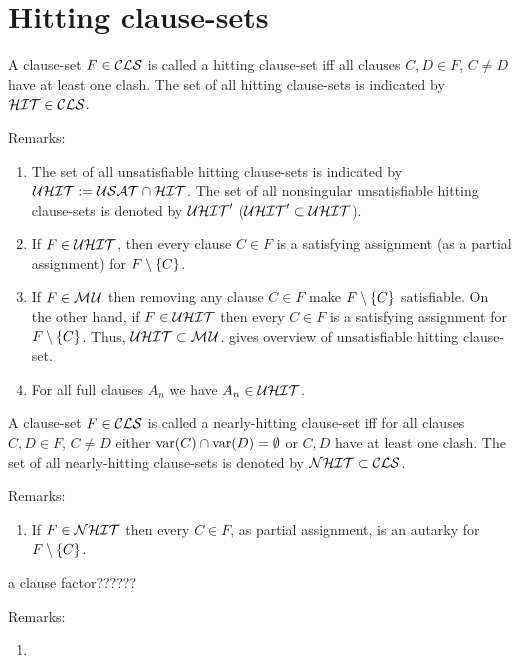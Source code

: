 \documentclass{report}
\begin{document}
\section{Hitting clause-sets}
\label{sec:hit}

\begin{defi}\label{def:hit-cls}
A clause-set $F \in \mathcal{CLS} $ is called a hitting clause-set iff all clauses $C,D \in F$, $C \not = D$ have at least one clash. The set of all hitting clause-sets is indicated by $\mathcal{HIT} \in \mathcal{CLS}$.
\end{defi}
Remarks:
  \begin{enumerate}
  \item The set of all unsatisfiable hitting clause-sets is indicated by $\mathcal{U}\mathcal{HIT} := \mathcal{USAT} \cap \mathcal{HIT}$. The set of all nonsingular unsatisfiable hitting clause-sets is denoted by $\mathcal{U}\mathcal{HIT}'$ ($\mathcal{U}\mathcal{HIT}' \subset \mathcal{U}\mathcal{HIT}$).
  \item If $F \in \mathcal{U}\mathcal{HIT}$, then every clause $C \in F$ is a satisfying assignment (as a partial assignment) for $F \setminus \{ C \}$.
  \item If $F \in \mathcal{M\hspace{0.8pt}U}$ then removing any clause $C \in F$ make $F \setminus \{ C \}$ satisfiable. On the other hand, if $F \in \mathcal{U}\mathcal{HIT}$ then every $C \in F$ is a satisfying assignment for $F \setminus \{ C \}$. Thus, $\mathcal{U}\mathcal{HIT} \subset \mathcal{M\hspace{0.8pt}U}$. \cite{h26} gives overview of unsatisfiable hitting clause-set.
  \item For all full clauses $A_n$ we have $A_n \in \mathcal{U}\mathcal{HIT}$.
  \end{enumerate}

 \begin{defi}\label{def:nhit-cls}
A clause-set $F \in \mathcal{CLS} $ is called a nearly-hitting clause-set iff for all clauses $C,D \in F$, $C \not = D$ either $\operatorname{var}(C) \cap \operatorname{var}(D) = \emptyset$ or $C,D$ have at least one clash. The set of all nearly-hitting clause-sets is denoted by $\mathcal{NHIT} \subset \mathcal{CLS}$.
\end{defi}
Remarks:
  \begin{enumerate}
  \item If $F \in \mathcal{NHIT}$ then every $C \in F$, as partial assignment, is an autarky for $F \setminus \{ C \}$.
  \end{enumerate}

\begin{defi}\label{def:cl-factor}
\cite {h26} a clause factor??????
\end{defi}
Remarks:
  \begin{enumerate}
  \item 
  \end{enumerate}    
               
\end{document}
